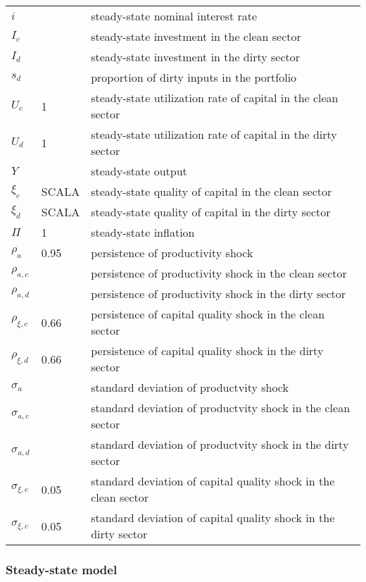 \documentclass{article}
\begin{document}
\begin{center}
\begin{tabular}{lll}
$i$ &  & steady-state nominal interest rate \\ 
$I_{c}$ &  & steady-state investment in the clean sector \\ 
$I_{d}$ &  & steady-state investment in the dirty sector \\ 
$s_{d}$ &  & proportion of dirty inputs in the portfolio \\ 
$U_{c}$ & 1 & steady-state utilization rate of capital in the clean sector
\\ 
$U_{d}$ & 1 & steady-state utilization rate of capital in the dirty sector
\\ 
$Y$ &  & steady-state output \\ 
$\xi _{c}$ & SCALA & steady-state quality of capital in the clean sector \\ 
$\xi _{d}$ & SCALA & steady-state quality of capital in the dirty sector \\ 
$\Pi $ & 1 & steady-state inflation \\ 
$\rho _{a}$ & 0.95 & persistence of productivity shock \\ 
$\rho _{a,c}$ &  & persistence of productivity shock in the clean sector \\ 
$\rho _{a,d}$ &  & persistence of productivity shock in the dirty sector \\ 
$\rho _{\xi ,c}$ & 0.66 & persistence of capital quality shock in the clean
sector \\ 
$\rho _{\xi ,d}$ & 0.66 & persistence of capital quality shock in the dirty
sector \\ 
$\sigma _{a}$ &  & standard deviation of productvity shock \\ 
$\sigma _{a,c}$ &  & standard deviation of productvity shock in the clean
sector \\ 
$\sigma _{a,d}$ &  & standard deviation of productvity shock in the dirty
sector \\ 
$\sigma _{\xi ,c}$ & 0.05 & standard deviation of capital quality shock in
the clean sector \\ 
$\sigma _{\xi ,c}$ & 0.05 & standard deviation of capital quality shock in
the dirty sector%
\end{tabular}
\end{center}

\subsubsection{Steady-state model}
\end{document}
